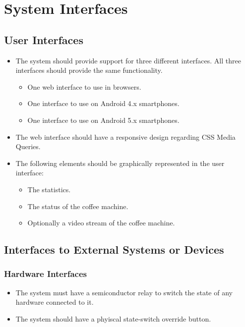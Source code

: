 \section{System Interfaces}

\subsection{User Interfaces}

\begin{itemize}
\item The system should provide support for three different interfaces. All three interfaces should provide the same functionality.
  \begin{itemize}
  \item One web interface to use in browsers.
  \item One interface to use on Android 4.x smartphones.
  \item One interface to use on Android 5.x smartphones.
  \end{itemize}

\item The web interface should have a responsive design regarding CSS Media Queries.

\item The following elements should be graphically represented in the user interface:
  \begin{itemize}
  \item The statistics.
  \item The status of the coffee machine.
  \item Optionally a video stream of the coffee machine.
  \end{itemize}
\end{itemize}

\subsection{Interfaces to External Systems or Devices}

\subsubsection{Hardware Interfaces}

\begin{itemize}
\item The system must have a semiconductor relay to switch the state of any hardware connected to it.
\item The system should have a phyiscal state-switch override button.
\end{itemize}

